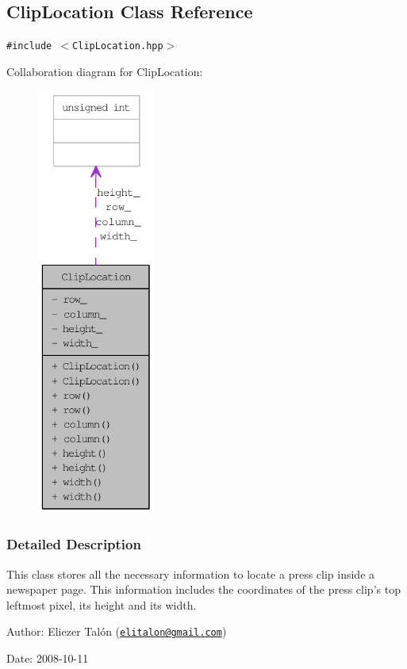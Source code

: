 \hypertarget{class_clip_location}{
\subsection{ClipLocation Class Reference}
\label{class_clip_location}
}
{\tt \#include $<$ClipLocation.hpp$>$}

Collaboration diagram for ClipLocation:\nopagebreak
\begin{figure}[H]
\begin{center}
\leavevmode
\includegraphics[height=400pt]{class_clip_location__coll__graph}
\end{center}
\end{figure}


\subsubsection{Detailed Description}
This class stores all the necessary information to locate a press clip inside a newspaper page. This information includes the coordinates of the press clip's top leftmost pixel, its height and its width.

\begin{Desc}
\item[Author:]Eliezer Talón (\href{mailto:elitalon@gmail.com}{\tt elitalon@gmail.com}) \end{Desc}
\begin{Desc}
\item[Date:]2008-10-11 \end{Desc}
